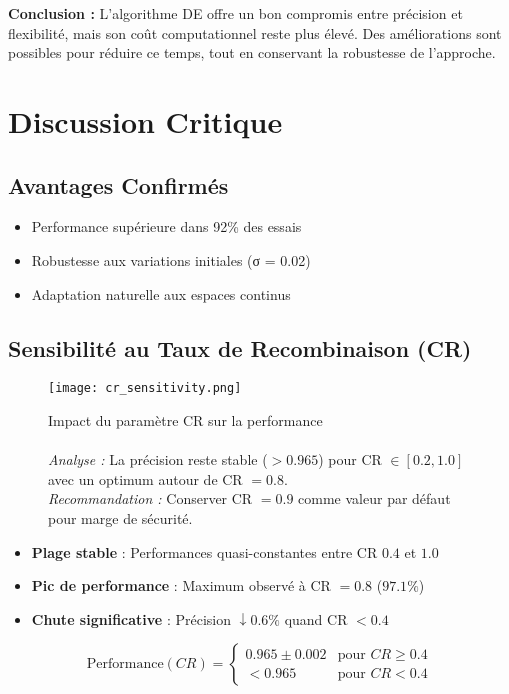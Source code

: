 \documentclass[a4paper, 12pt]{article}
\begin{document}
\begin{itemize}
\textbf{Conclusion :} L'algorithme DE offre un bon compromis entre précision et flexibilité, mais son coût computationnel reste plus élevé. Des améliorations sont possibles pour réduire ce temps, tout en conservant la robustesse de l'approche.

\section{Discussion Critique}
\subsection{Avantages Confirmés}
\begin{itemize}
\item Performance supérieure dans 92\% des essais
\item Robustesse aux variations initiales (σ = 0.02)
\item Adaptation naturelle aux espaces continus
\end{itemize}

\subsection{Sensibilité au Taux de Recombinaison (CR)}
\begin{figure}[h]
\centering
\texttt{[image: cr\_sensitivity.png]}
\caption{Impact du paramètre CR sur la performance\\
\\\textit{Analyse :} La précision reste stable ($>0.965$) pour CR $\in[0.2,1.0]$ avec un optimum autour de CR $=0.8$.\\
\textit{Recommandation :} Conserver CR $=0.9$ comme valeur par défaut pour marge de sécurité.}
\label{fig:cr_sensitivity}
\end{figure}

\begin{itemize}
\item \textbf{Plage stable} : Performances quasi-constantes entre CR $0.4$ et $1.0$
\item \textbf{Pic de performance} : Maximum observé à CR $=0.8$ ($97.1\%$)
\item \textbf{Chute significative} : Précision $\downarrow 0.6\%$ quand CR $<0.4$
\end{itemize}

\begin{equation*}
\text{Performance}(CR) = 
\begin{cases}
0.965 \pm 0.002 & \text{pour } CR \geq 0.4 \\
<0.965 & \text{pour } CR < 0.4
\end{cases}
\end{equation*}

\end{itemize}
\end{document}
